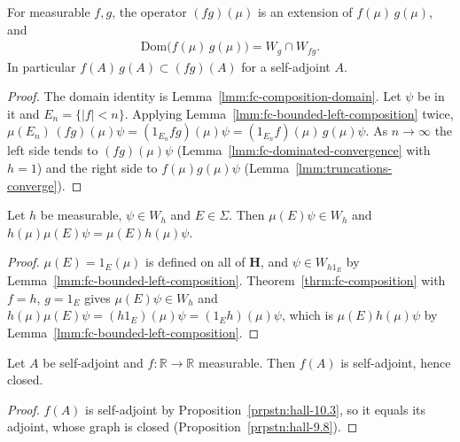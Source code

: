 \begin{theorem}
    \label{thrm:fc-composition}
    \leanok
    For measurable $f, g$, the operator $(fg)(\mu)$ is an extension of $f(\mu)\,g(\mu)$, and
    \begin{align}
        \text{Dom}\big( f(\mu)\,g(\mu) \big) = W_g \cap W_{fg}.
    \end{align}
    In particular $f(A)\,g(A) \subset (fg)(A)$ for a self-adjoint $A$.
\end{theorem}
\begin{proof}
    \leanok
    The domain identity is Lemma~\ref{lmm:fc-composition-domain}. Let $\psi$ be in it and $E_n = \{|f| < n\}$. Applying Lemma~\ref{lmm:fc-bounded-left-composition} twice, $\mu(E_n)\,(fg)(\mu)\psi = (1_{E_n} f g)(\mu)\psi = (1_{E_n} f)(\mu)\,g(\mu)\psi$. As $n \to \infty$ the left side tends to $(fg)(\mu)\psi$ (Lemma~\ref{lmm:fc-dominated-convergence} with $h = 1$) and the right side to $f(\mu)g(\mu)\psi$ (Lemma~\ref{lmm:truncations-converge}).
\end{proof}

\begin{lemma}
    \label{lmm:fc-commutes-with-projections}
    \leanok
    Let $h$ be measurable, $\psi \in W_h$ and $E \in \Sigma$. Then $\mu(E)\psi \in W_h$ and $h(\mu)\mu(E)\psi = \mu(E)h(\mu)\psi$.
\end{lemma}
\begin{proof}
    \leanok
    $\mu(E) = 1_E(\mu)$ is defined on all of $\mathbf{H}$, and $\psi \in W_{h 1_E}$ by Lemma~\ref{lmm:fc-bounded-left-composition}. Theorem~\ref{thrm:fc-composition} with $f = h$, $g = 1_E$ gives $\mu(E)\psi \in W_h$ and $h(\mu)\mu(E)\psi = (h1_E)(\mu)\psi = (1_E h)(\mu)\psi$, which is $\mu(E)h(\mu)\psi$ by Lemma~\ref{lmm:fc-bounded-left-composition}.
\end{proof}

\begin{lemma}
    \label{lmm:fc-real-closed}
    \leanok
    Let $A$ be self-adjoint and $f : \mathbb{R} \to \mathbb{R}$ measurable. Then $f(A)$ is self-adjoint, hence closed.
\end{lemma}
\begin{proof}
    \leanok
    $f(A)$ is self-adjoint by Proposition~\ref{prpstn:hall-10.3}, so it equals its adjoint, whose graph is closed (Proposition~\ref{prpstn:hall-9.8}).
\end{proof}


